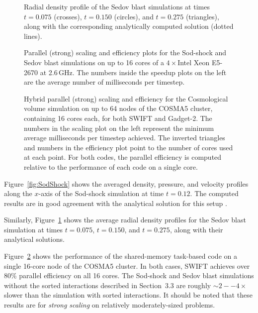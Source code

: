 \documentclass[final]{siamltex}
\newcommand{\fig}[1]
    {Figure~\ref{fig:#1}}
\begin{document}
\begin{figure}
    \centerline{}
    \caption{Radial density profile of the Sedov blast simulations at
        times $t=0.075$ (crosses), $t=0.150$ (circles), and $t=0.275$
        (triangles), along with the corresponding analytically computed solution
        (dotted lines).}
    \label{fig:SedovBlast}
\end{figure}

\begin{figure}
    \centerline{}
    \centerline{}
    \caption{Parallel (strong) scaling and efficiency plots for the Sod-shock and
        Sedov blast simulations on up to 16 cores of a $4\times$Intel Xeon E5-2670
        at 2.6\,GHz. The numbers inside the speedup plots on the left are
        the average number of milliseconds per timestep.}
    \label{fig:Scaling}
\end{figure}

\begin{figure}
    \centerline{}
    \caption{Hybrid parallel (strong) scaling and efficiency for the
        Cosmological volume simulation on up to 64 nodes of the COSMA5
        cluster, containing 16 cores each, for both SWIFT and Gadget-2.
        The numbers in the scaling plot on the left represent the minimum
        average milliseconds per timestep achieved.
        The inverted triangles and numbers in the efficiency plot point to
        the number of cores used at each point.
        For both codes, the parallel efficiency is computed relative to
        the performance of each code on a single core.}
    \label{fig:CosmoVolume}
\end{figure}


\fig{SodShock} shows the averaged density, pressure, and velocity profiles
along the $x$-axis of the Sod-shock simulation at time $t=0.12$.
The computed results are in good agreement with the analytical solution
for this setup \cite{ref:Sod1978}.

Similarly, \fig{SedovBlast} shows the average radial density profiles
for the Sedov blast simulation at times $t=0.075$, $t=0.150$, and $t=0.275$,
along with their analytical solutions.

\fig{Scaling} shows the performance of the shared-memory task-based 
code on a single 16-core node of the COSMA5 cluster.
In both cases, SWIFT achieves over 80\% parallel efficiency on all
16 cores.
The Sod-shock and Sedov blast simulations without the sorted
interactions described
in Section~3.3 are roughly $\sim 2--4\times$ slower than the simulation
with sorted interactions.
It should be noted that these results are for {\em strong scaling}
on relatively moderately-sized problems.
\end{document}
